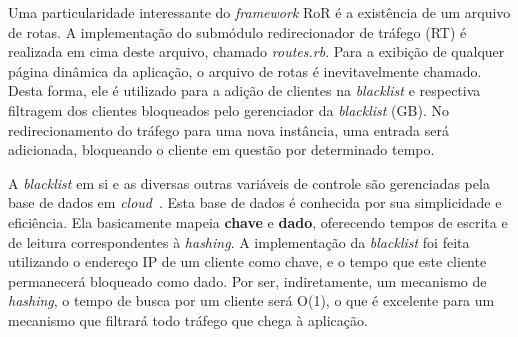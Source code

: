 Uma particularidade interessante do \emph{framework} RoR é a existência de um arquivo de rotas. A implementação do submódulo redirecionador de tráfego (RT) é realizada em cima deste arquivo, chamado \emph{routes.rb}. Para a exibição de qualquer página dinâmica da aplicação, o arquivo de rotas é inevitavelmente chamado. Desta forma, ele é utilizado para a adição de clientes na \emph{blacklist} e respectiva filtragem dos clientes bloqueados pelo gerenciador da \emph{blacklist} (GB). No redirecionamento do tráfego para uma nova instância, uma entrada será adicionada, bloqueando o cliente em questão por determinado tempo.

A \emph{blacklist} em si e as diversas outras variáveis de controle são gerenciadas pela base de dados em \emph{cloud}~\cite{redis}. Esta base de dados é conhecida por sua simplicidade e eficiência. Ela basicamente mapeia \textbf{chave} e \textbf{dado}, oferecendo tempos de escrita e de leitura correspondentes à \emph{hashing}. A implementação da \emph{blacklist} foi feita utilizando o endereço IP de um cliente como chave, e o tempo que este cliente permanecerá bloqueado como dado. Por ser, indiretamente, um mecanismo de \emph{hashing}, o tempo de busca por um cliente será O(1), o que é excelente para um mecanismo que filtrará todo tráfego que chega à aplicação. %

